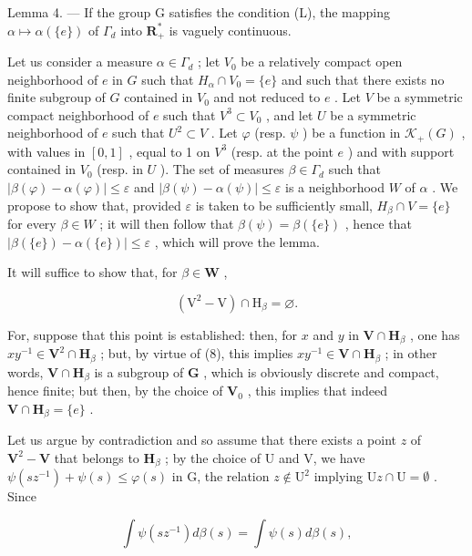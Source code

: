 Lemma 4. --- If the group G satisfies the condition (L), the mapping \(\alpha \mapsto \alpha (\{e\})\) of \(\Gamma_d\) into \(\mathbf{R}_+^*\) is vaguely continuous.

Let us consider a measure \(\alpha \in \Gamma_d\) ; let \(V_0\) be a relatively compact open neighborhood of \(e\) in \(G\) such that \(H_\alpha \cap V_0 = \{e\}\) and such that there exists no finite subgroup of \(G\) contained in \(V_0\) and not reduced to \(e\) . Let \(V\) be a symmetric compact neighborhood of \(e\) such that \(V^3 \subset V_0\) , and let \(U\) be a symmetric neighborhood of \(e\) such that \(U^2 \subset V\) . Let \(\varphi\) (resp. \(\psi\) ) be a function in \(\mathcal{K}_+(G)\) , with values in \([0,1]\) , equal to 1 on \(V^3\) (resp. at the point \(e\) ) and with support contained in \(V_0\) (resp. in \(U\) ). The set of measures \(\beta \in \Gamma_d\) such that \(|\beta(\varphi) - \alpha(\varphi)| \leqslant \varepsilon\) and \(|\beta(\psi) - \alpha(\psi)| \leqslant \varepsilon\) is a neighborhood \(W\) of \(\alpha\) . We propose to show that, provided \(\varepsilon\) is taken to be sufficiently small, \(H_\beta \cap V = \{e\}\) for every \(\beta \in W\) ; it will then follow that \(\beta(\psi) = \beta(\{e\})\) , hence that \(|\beta(\{e\}) - \alpha(\{e\})| \leqslant \varepsilon\) , which will prove the lemma.

It will suffice to show that, for \(\beta \in \mathbf{W}\) ,

\[
(\mathrm{V} ^ {2} - \mathrm{V}) \cap \mathrm{H} _ {\beta} = \varnothing .\tag{8}
\]

For, suppose that this point is established: then, for \(x\) and \(y\) in \(\mathbf{V} \cap \mathbf{H}_{\beta}\) , one has \(xy^{-1} \in \mathbf{V}^2 \cap \mathbf{H}_{\beta}\) ; but, by virtue of (8), this implies \(xy^{-1} \in \mathbf{V} \cap \mathbf{H}_{\beta}\) ; in other words, \(\mathbf{V} \cap \mathbf{H}_{\beta}\) is a subgroup of \(\mathbf{G}\) , which is obviously discrete and compact, hence finite; but then, by the choice of \(\mathbf{V}_0\) , this implies that indeed \(\mathbf{V} \cap \mathbf{H}_{\beta} = \{e\}\) .

Let us argue by contradiction and so assume that there exists a point \(z\) of \(\mathbf{V}^2 -\mathbf{V}\) that belongs to \(\mathbf{H}_{\beta}\) ; by the choice of U and V, we have \(\psi (sz^{-1}) + \psi (s)\leqslant \varphi (s)\) in G, the relation \(z\notin \mathrm{U}^2\) implying \(\mathrm{U}z\cap \mathrm{U} = \emptyset\) . Since

\[
\int \psi (s z ^ {- 1}) d \beta (s) = \int \psi (s) d \beta (s),
\]

